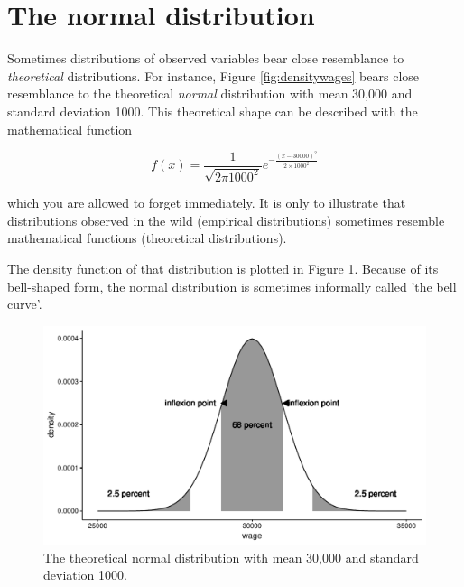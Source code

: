 \documentclass[]{book}\usepackage[]{graphicx}\usepackage[]{color}
\makeatletter
\def\maxwidth{ %
  \ifdim\Gin@nat@width>\linewidth
    \linewidth
  \else
    \Gin@nat@width
  \fi
}
\newenvironment{knitrout}{}{} %
\makeatother
\begin{document}
\section{The normal distribution}

Sometimes distributions of observed variables bear close resemblance to \textit{theoretical} distributions. For instance, Figure \ref{fig:densitywages} bears close resemblance to the theoretical \textit{normal} distribution with mean 30,000 and standard deviation 1000. This theoretical shape can be described with the mathematical function

\begin{equation}
f(x)  = \frac{1}{\sqrt{2 \pi 1000^2}} e^{ { -\frac{(x - 30000)^2}{2 \times  1000^2}  } }
\end{equation}

which you are allowed to forget immediately. It is only to illustrate that distributions observed in the wild (empirical distributions) sometimes resemble  mathematical functions (theoretical distributions).

The density function of that distribution is plotted in Figure \ref{fig:distr_4}. Because of its bell-shaped form, the normal distribution is sometimes informally called 'the bell curve'.




\begin{knitrout}
\color{fgcolor}\begin{figure}

{\centering \includegraphics[width=\maxwidth]{figure/distr_4-1} 

}

\caption[The theoretical normal distribution with mean 30,000 and standard deviation 1000]{The theoretical normal distribution with mean 30,000 and standard deviation 1000.}\label{fig:distr_4}
\end{figure}


\end{knitrout}
\end{document}
